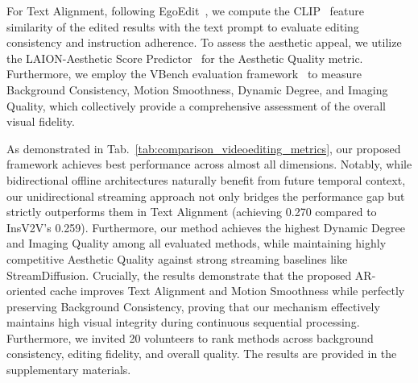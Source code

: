 \documentclass{llmxive}
\begin{document}
For Text Alignment, following EgoEdit~\cite{li2025egoedit}, we compute the CLIP~\cite{radford2021learning} feature similarity of the edited results with the text prompt to evaluate editing consistency and instruction adherence. To assess the aesthetic appeal, we utilize the LAION-Aesthetic Score Predictor~\cite{laion2022aesthetics} for the Aesthetic Quality metric. Furthermore, we employ the VBench evaluation framework~\cite{huang2024vbench} to measure Background Consistency, Motion Smoothness, Dynamic Degree, and Imaging Quality, which collectively provide a comprehensive assessment of the overall visual fidelity.


As demonstrated in Tab.~\ref{tab:comparison_videoediting_metrics}, our proposed framework achieves best performance across almost all dimensions. Notably, while bidirectional offline architectures naturally benefit from future temporal context, our unidirectional streaming approach not only bridges the performance gap but strictly outperforms them in Text Alignment (achieving 0.270 compared to InsV2V's 0.259). Furthermore, our method achieves the highest Dynamic Degree and Imaging Quality among all evaluated methods, while maintaining highly competitive Aesthetic Quality against strong streaming baselines like StreamDiffusion. Crucially, the results demonstrate that the proposed AR-oriented cache improves Text Alignment and Motion Smoothness while perfectly preserving Background Consistency, proving that our mechanism effectively maintains high visual integrity during continuous sequential processing. Furthermore, we invited 20 volunteers to rank methods across background consistency, editing fidelity, and overall quality. The results are provided in the supplementary materials.


\begin{table}[t]
  \centering
    \vspace{-1em}
  \label{tab:three_stages_ablation}
\caption{\textbf{Ablation of our three-stage distillation pipeline.} Comparison of generation configurations and inference efficiency across the different training stages.}
\end{table}
\end{document}
